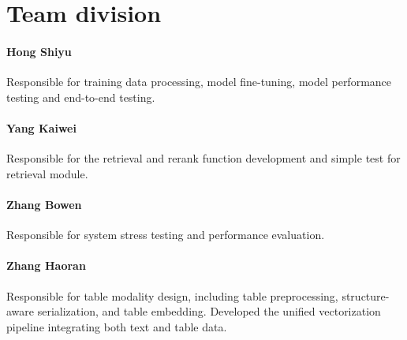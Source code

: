 \documentclass[10pt,conference]{IEEEtran}
\begin{document}
\section{Team division}
\paragraph{Hong Shiyu} Responsible for training data processing, model fine-tuning, model performance testing and end-to-end testing.
\paragraph{Yang Kaiwei} Responsible for the retrieval and rerank function development and simple test for retrieval module.  
\paragraph{Zhang Bowen} Responsible for system stress testing and performance evaluation.
\paragraph{Zhang Haoran} Responsible for table modality design, including table preprocessing, structure-aware serialization, and table embedding. Developed the unified vectorization pipeline integrating both text and table data.
\end{document}
